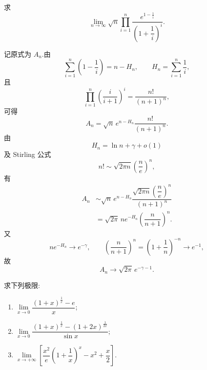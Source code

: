 \begin{example}
    求
    \[
        \displaystyle\lim\limits_{n\to\infty}
        \sqrt{n}
        \prod\limits_{i=1}^{n}
        \dfrac{e^{1-\frac{1}{i}}}{\left(1+\dfrac{1}{i}\right)^i}.
    \]
\end{example}
\exampleblank

\begin{solution}
    记原式为 $A_n$.由
    \[
        \displaystyle\sum\limits_{i=1}^{n}\left(1-\dfrac{1}{i}\right)
        =n-H_n,
        \qquad
        H_n=\sum\limits_{i=1}^{n}\dfrac{1}{i},
    \]
    且
    \[
        \displaystyle\prod\limits_{i=1}^{n}
        \left(\dfrac{i}{i+1}\right)^i
        =\dfrac{n!}{(n+1)^n},
    \]
    可得
    \[
        A_n
        =\sqrt{n}\,e^{n-H_n}\dfrac{n!}{(n+1)^n}.
    \]
    由
    \[
        H_n=\ln n+\gamma+o(1)
    \]
    及 Stirling 公式
    \[
        n!\sim\sqrt{2\pi n}\left(\dfrac{n}{e}\right)^n,
    \]
    有
    \[
        \begin{aligned}
            A_n
             & \sim
            \sqrt{n}\,e^{n-H_n}
            \dfrac{\sqrt{2\pi n}\left(\dfrac{n}{e}\right)^n}{(n+1)^n} \\
             & =
            \sqrt{2\pi}\,
            ne^{-H_n}
            \left(\dfrac{n}{n+1}\right)^n.
        \end{aligned}
    \]
    又
    \[
        ne^{-H_n}\longrightarrow e^{-\gamma},
        \qquad
        \left(\dfrac{n}{n+1}\right)^n
        =\left(1+\dfrac{1}{n}\right)^{-n}
        \longrightarrow e^{-1},
    \]
    故
    \[
        A_n\longrightarrow\sqrt{2\pi}\,e^{-\gamma-1}.
    \]
\end{solution}

\begin{example}
    求下列极限:
    \begin{enumerate}
        \item $\displaystyle
                  \lim\limits_{x\to0}
                  \dfrac{(1+x)^{\frac{1}{x}}-e}{x}$;
        \item $\displaystyle
                  \lim\limits_{x\to0}
                  \dfrac{(1+x)^{\frac{1}{x}}-(1+2x)^{\frac{1}{2x}}}{\sin x}$;
        \item $\displaystyle
                  \lim\limits_{x\to+\infty}
                  \left[
                      \dfrac{x^2}{e}\left(1+\dfrac{1}{x}\right)^x
                      -x^2+\dfrac{x}{2}
                      \right]$.
    \end{enumerate}
\end{example}
\exampleblank

